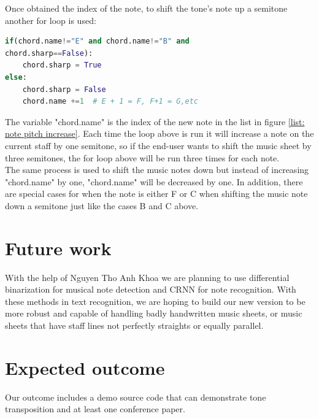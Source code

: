 \documentclass[final]{cvpr}
\begin{document}
Once obtained the index of the note, to shift the tone's note up a semitone 
another for loop is used:\\

\begin{lstlisting}[language=Python]
if(chord.name!="E" and chord.name!="B" and 
chord.sharp==False):
    chord.sharp = True
else:
    chord.sharp = False
    chord.name +=1  # E + 1 = F, F+1 = G,etc
\end{lstlisting}
\medskip
The variable "chord.name" is the index of the new note in the list in figure
\ref{list: note pitch increase}.  Each time the loop above is run it will
increase a note on the current staff by one semitone, so if the end-user wants to shift
the music sheet by three semitones, the for loop above will be run three
times for each note.\\

The same process is used to shift the music notes down but instead of increasing
"chord.name" by one, "chord.name" will be decreased by one. In addition, there are
special cases for when the note is either F or C when shifting the music note
down a semitone just like the cases B and C above.

\section{Future work}
With the help of Nguyen Tho Anh Khoa we are
planning to use differential binarization for musical note detection and CRNN
for note recognition. With these methods in text recognition, we are hoping to
build our new version to be more robust and capable of handling badly handwritten music
sheets, or music sheets that have staff lines not perfectly straights or
equally parallel.\\


\section{Expected outcome}
Our outcome includes a demo source code that can demonstrate tone transposition and at least one conference
paper. 




{\small


}
\end{document}
